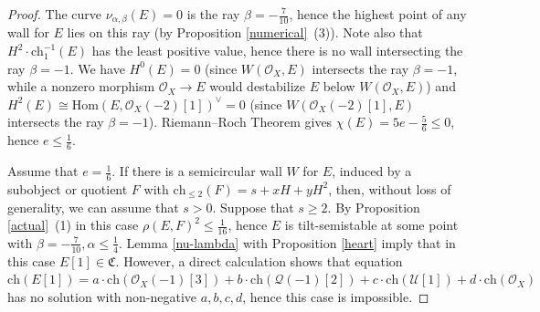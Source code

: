 \documentclass{amsart}
\begin{document}
	\begin{proof}The curve $\nu_{\alpha,\beta}(E)=0$ is the ray $\beta=-\frac{7}{10}$, hence the highest point of any wall for $E$ lies on this ray (by Proposition \ref{numerical}~(3)). Note also that $H^2\cdot\mathrm{ch}_1^{-1}(E)$	has the least positive value, hence there is no wall intersecting the ray $\beta=-1$. We have $H^0(E)=0$ (since $W(\mathcal O_X,E)$ intersects the ray $\beta=-1$, while a nonzero morphism $\mathcal O_X\to E$ would destabilize $E$ below $W(\mathcal O_X,E)$) and $H^2(E)\cong\mathrm{Hom}(E,\mathcal O_X(-2)[1])^\vee=0$ (since $W(\mathcal O_X(-2)[1],E)$ intersects the ray $\beta=-1$). Riemann--Roch Theorem gives $\chi(E)=5e-\frac 56\le 0$, hence $e\le\frac 16$. 
		
	Assume that $e=\frac 16$. If there is a semicircular wall $W$ for $E$, induced by a subobject or quotient $F$ with $\mathrm{ch}_{\le 2}(F)=s+xH+yH^2$, then, without loss of generality, we can assume that $s>0$. Suppose that $s\ge 2$. By Proposition \ref{actual}~(1) in this case $\rho(E,F)^2\le\frac{1}{16}$, hence $E$ is tilt-semistable at some point with $\beta=-\frac{7}{10},\alpha\le\frac 14$. Lemma \ref{nu-lambda} with Proposition \ref{heart} imply that in this case $E[1]\in\mathfrak C$. However, a direct calculation shows that equation $\mathrm{ch}(E[1])=a\cdot\mathrm{ch}(\mathcal O_X(-1)[3])+b\cdot\mathrm{ch}(\mathcal Q(-1)[2])+c\cdot\mathrm{ch}(\mathcal U[1])+d\cdot\mathrm{ch}(\mathcal O_X)$ has no solution with non-negative $a,b,c,d$, hence this case is impossible.
		

\end{proof}
\end{document}
